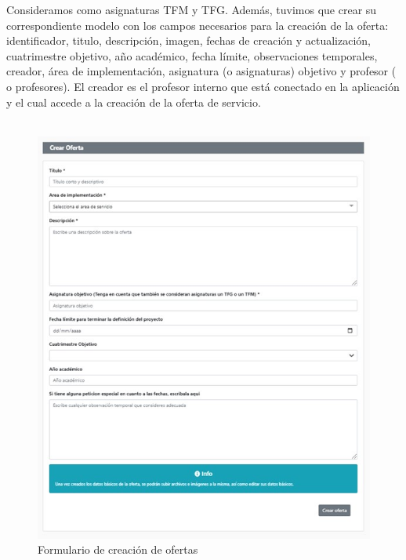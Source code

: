 \documentclass[11pt]{book}
\begin{document}
 Consideramos como asignaturas TFM y TFG.
 Además, tuvimos que crear su correspondiente modelo con los campos necesarios para la creación de la oferta: identificador, titulo, descripción, imagen, fechas de creación y actualización, cuatrimestre objetivo, año académico, fecha límite, observaciones temporales, creador, área de implementación, asignatura (o asignaturas) objetivo y profesor ( o profesores). El creador es el profesor interno que está conectado en la aplicación y el cual accede a la creación de la oferta de servicio.\\\\
 
 
 \begin{figure}[t]
 	\centering
 	\includegraphics[scale=0.9]{oferta}
 	\caption{Formulario de creación de ofertas}
 \end{figure}
\end{document}
